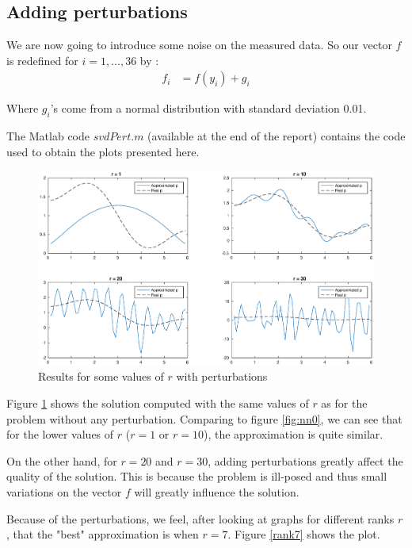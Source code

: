 \subsection*{Adding perturbations}

We are now going to introduce some noise on the measured data. So our vector $f$ is redefined for $i=1,...,36$ by :
\begin{align*}
f_i&=f(y_i)+g_i 
\end{align*}

Where $g_i$'s come from a normal distribution with standard deviation 0.01. 

The Matlab code $svdPert.m$ (available at the end of the report) contains the code used to obtain the plots presented here.

\begin{figure}
\begin{center}
\includegraphics[scale=0.5]{perturb.eps}
\caption{Results for some values of $r$ with perturbations}
\label{perturb}
\end{center}
\end{figure}

Figure \ref{perturb} shows the solution computed with the same values of $r$ as for the problem without any perturbation. Comparing to figure \ref{fig:nn0}, we can see that for the lower values of $r$ ($r=1$ or $r=10$), the approximation is quite similar. 

On the other hand, for $r=20$ and $r=30$, adding perturbations greatly affect the quality of the solution. This is because the problem is ill-posed and thus small variations on the vector $f$ will greatly influence the solution.

Because of the perturbations, we feel, after looking at graphs for different ranks $r$, that the "best" approximation is when $r=7$. Figure \ref{rank7} shows the plot.

